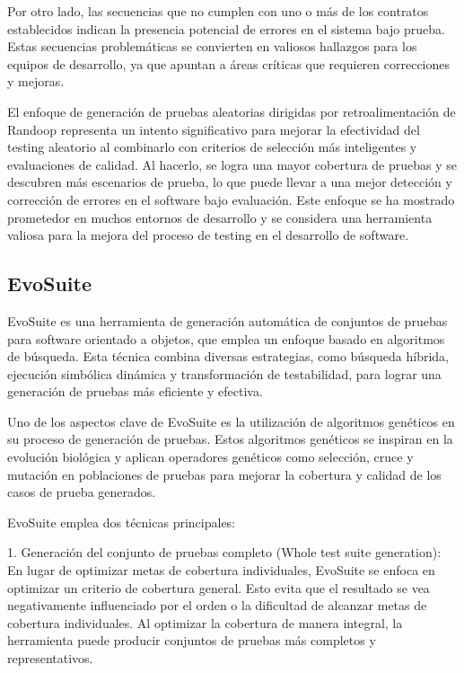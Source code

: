 Por otro lado, las secuencias que no cumplen con uno o más de los contratos establecidos indican la presencia potencial de errores en el sistema bajo prueba. Estas secuencias problemáticas se convierten en valiosos hallazgos para los equipos de desarrollo, ya que apuntan a áreas críticas que requieren correcciones y mejoras.

El enfoque de generación de pruebas aleatorias dirigidas por retroalimentación de Randoop representa un intento significativo para mejorar la efectividad del testing aleatorio al combinarlo con criterios de selección más inteligentes y evaluaciones de calidad. Al hacerlo, se logra una mayor cobertura de pruebas y se descubren más escenarios de prueba, lo que puede llevar a una mejor detección y corrección de errores en el software bajo evaluación. Este enfoque se ha mostrado prometedor en muchos entornos de desarrollo y se considera una herramienta valiosa para la mejora del proceso de testing en el desarrollo de software.


\subsection{EvoSuite}

EvoSuite es una herramienta de generación automática de conjuntos de pruebas para software orientado a objetos, que emplea un enfoque basado en algoritmos de búsqueda. Esta técnica combina diversas estrategias, como búsqueda híbrida, ejecución simbólica dinámica y transformación de testabilidad, para lograr una generación de pruebas más eficiente y efectiva.

Uno de los aspectos clave de EvoSuite es la utilización de algoritmos genéticos en su proceso de generación de pruebas. Estos algoritmos genéticos se inspiran en la evolución biológica y aplican operadores genéticos como selección, cruce y mutación en poblaciones de pruebas para mejorar la cobertura y calidad de los casos de prueba generados.

EvoSuite emplea dos técnicas principales:

1. Generación del conjunto de pruebas completo (Whole test suite generation):
En lugar de optimizar metas de cobertura individuales, EvoSuite se enfoca en optimizar un criterio de cobertura general. Esto evita que el resultado se vea negativamente influenciado por el orden o la dificultad de alcanzar metas de cobertura individuales. Al optimizar la cobertura de manera integral, la herramienta puede producir conjuntos de pruebas más completos y representativos.

